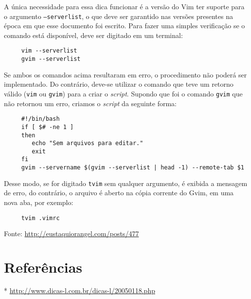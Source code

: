 A única necessidade para essa dica funcionar é a versão do Vim ter suporte para
o argumento {\tt --serverlist}, o que deve ser garantido nas versões presentes
na época em que esse documento foi escrito. Para fazer uma simples verificação
se o comando está disponível, deve ser digitado em um terminal:

\begin{verbatim}
     vim --serverlist
     gvim --serverlist
\end{verbatim}

Se ambos os comandos acima resultaram em erro, o procedimento não poderá ser
implementado. Do contrário, deve-se utilizar o comando que teve um retorno
válido ({\tt vim} ou {\tt gvim}) para a criar o {\em script}. Supondo que foi o
comando {\tt gvim} que não retornou um erro, criamos o {\em script} da seguinte
forma:

\begin{verbatim}
     #!/bin/bash
     if [ $# -ne 1 ]
     then
        echo "Sem arquivos para editar."
        exit
     fi
     gvim --servername $(gvim --serverlist | head -1) --remote-tab $1
\end{verbatim}

Desse modo, se for digitado {\tt tvim} sem qualquer argumento, é exibida a
mensagem de erro, do contrário, o arquivo é aberto na cópia corrente do Gvim,
em uma nova aba, por exemplo:

\begin{verbatim}
     tvim .vimrc
\end{verbatim}

Fonte: \url{http://eustaquiorangel.com/posts/477}

\section{Referências}
\label{Referências}
* \url{http://www.dicas-l.com.br/dicas-l/20050118.php}
